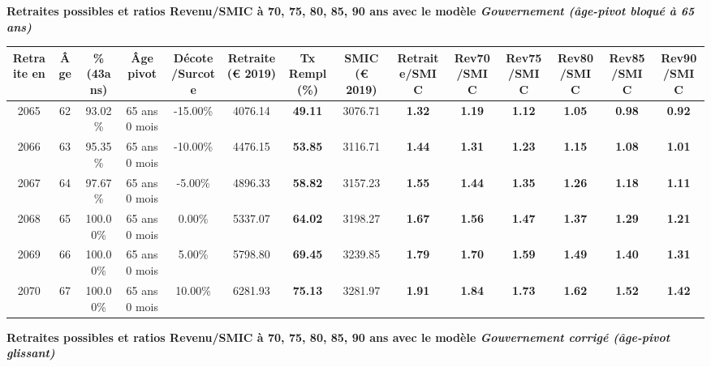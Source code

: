 {\bf \noindent Retraites possibles et ratios Revenu/SMIC à 70, 75, 80, 85, 90 ans avec le modèle \emph{Gouvernement (âge-pivot bloqué à 65 ans)}}  
 
\begin{adjustbox}{max width=\textwidth} 
\begin{tabular}[htb]{|c|c||c|c|c||c|c||c||c|c|c|c|c|c|} 
\hline 
 Retraite en &  Âge &  \%(43ans) &  Âge pivot &  Décote/Surcote &  Retraite (\euro{} 2019) &  Tx Rempl(\%) &  SMIC (\euro{} 2019) &  Retraite/SMIC &  Rev70/SMIC &  Rev75/SMIC &  Rev80/SMIC &  Rev85/SMIC &  Rev90/SMIC \\ 
\hline \hline 
 2065 &  62 &  93.02\% &  65 ans 0 mois &  -15.00\% &  4076.14 &  {\bf 49.11} &  3076.71 &  {\bf 1.32} &  {\bf 1.19} &  {\bf 1.12} &  {\bf 1.05} &  {\bf {\color{red} 0.98}} &  {\bf {\color{red} 0.92}} \\ 
\hline 
 2066 &  63 &  95.35\% &  65 ans 0 mois &  -10.00\% &  4476.15 &  {\bf 53.85} &  3116.71 &  {\bf 1.44} &  {\bf 1.31} &  {\bf 1.23} &  {\bf 1.15} &  {\bf 1.08} &  {\bf 1.01} \\ 
\hline 
 2067 &  64 &  97.67\% &  65 ans 0 mois &  -5.00\% &  4896.33 &  {\bf 58.82} &  3157.23 &  {\bf 1.55} &  {\bf 1.44} &  {\bf 1.35} &  {\bf 1.26} &  {\bf 1.18} &  {\bf 1.11} \\ 
\hline 
 2068 &  65 &  100.00\% &  65 ans 0 mois &  0.00\% &  5337.07 &  {\bf 64.02} &  3198.27 &  {\bf 1.67} &  {\bf 1.56} &  {\bf 1.47} &  {\bf 1.37} &  {\bf 1.29} &  {\bf 1.21} \\ 
\hline 
 2069 &  66 &  100.00\% &  65 ans 0 mois &  5.00\% &  5798.80 &  {\bf 69.45} &  3239.85 &  {\bf 1.79} &  {\bf 1.70} &  {\bf 1.59} &  {\bf 1.49} &  {\bf 1.40} &  {\bf 1.31} \\ 
\hline 
 2070 &  67 &  100.00\% &  65 ans 0 mois &  10.00\% &  6281.93 &  {\bf 75.13} &  3281.97 &  {\bf 1.91} &  {\bf 1.84} &  {\bf 1.73} &  {\bf 1.62} &  {\bf 1.52} &  {\bf 1.42} \\ 
\hline 
\hline 
\end{tabular} 
\end{adjustbox} 
 
 \vspace{0.1cm} 
{\bf \noindent Retraites possibles et ratios Revenu/SMIC à 70, 75, 80, 85, 90 ans avec le modèle \emph{Gouvernement corrigé (âge-pivot glissant)}}  
 
